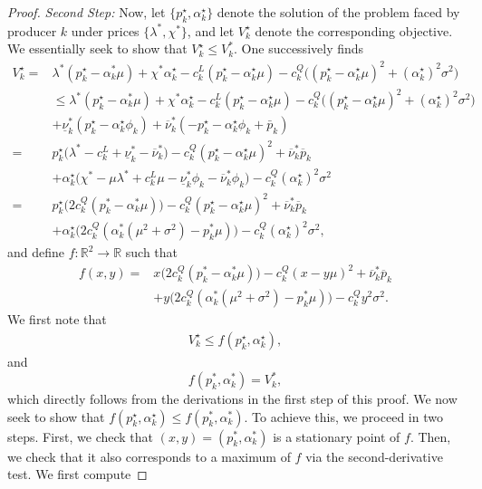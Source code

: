 \documentclass{article}
\begin{document}
\begin{proof}
\textit{Second Step:} Now, let $\{p_k^\star, \alpha_k^\star\}$ denote the solution of the problem faced by producer $k$ under prices $\{\lambda^*, \chi^*\}$, and let $V_k^\star$ denote the corresponding objective. We essentially seek to show that $V_k^\star \le V_k^*$. One successively finds
\begin{align*}
    V_k^\star =& \lambda^*(p_k^\star - \alpha_k^* \mu) + \chi^* \alpha_k^\star - c_k^L(p_k^\star - \alpha_k^\star \mu) - c_k^Q\big((p_k^\star - \alpha_k^\star \mu)^2 + (\alpha_k^\star)^2\sigma^2\big)\\
    &\le \lambda^*(p_k^\star - \alpha_k^* \mu) + \chi^* \alpha_k^\star - c_k^L(p_k^\star - \alpha_k^\star \mu) - c_k^Q\big((p_k^\star - \alpha_k^\star \mu)^2 + (\alpha_k^\star)^2\sigma^2\big)\\
    &+ \underline{\nu}_k^* (p_k^\star - \alpha_k^\star \phi_k) + \overline{\nu}_k^*(-p_k^\star - \alpha_k^\star \phi_k + \bar{p}_k)\\
    =& p_k^\star\big(\lambda^* - c_k^L + \underline{\nu}_k^* - \overline{\nu}_k^*\big) - c_k^Q(p_k^\star - \alpha_k^\star \mu)^2 + \overline{\nu}_k^* \overline{p}_k\\
    &+ \alpha_k^\star\big(\chi^* - \mu \lambda^* + c_k^L \mu - \underline{\nu}_k^* \phi_k - \overline{\nu}_k^* \phi_k\big) - c_k^Q (\alpha_k^\star)^2 \sigma^2 \\
   =& p_k^\star\big(2c_k^Q(p_k^* - \alpha_k^* \mu)\big) - c_k^Q(p_k^\star - \alpha_k^\star \mu)^2 + \overline{\nu}_k^* \overline{p}_k\\ 
    &+ \alpha_k^\star\big(2c_k^Q(\alpha_k^*(\mu^2+\sigma^2) - p_k^* \mu)\big) - c_k^Q (\alpha_k^\star)^2 \sigma^2,
\end{align*}
and define $f:\mathbb{R}^2 \rightarrow \mathbb{R}$ such that
\begin{align*}
f(x, y) =& x \big(2c_k^Q(p_k^* - \alpha_k^* \mu)\big) - c_k^Q(x - y \mu)^2 + \overline{\nu}_k^* \overline{p}_k\\ 
    &+ y \big(2c_k^Q(\alpha_k^*(\mu^2+\sigma^2) - p_k^* \mu)\big) - c_k^Q y^2 \sigma^2.
\end{align*}
We first note that
\begin{align*}
V_k^\star \le f(p_k^\star, \alpha_k^\star),
\end{align*} 
and
\begin{equation*}
f(p_k^*, \alpha_k^*) = V_k^*,
\end{equation*}
which directly follows from the derivations in the first step of this proof. We now seek to show that $f(p_k^\star, \alpha_k^\star) \le f(p_k^*, \alpha_k^*)$. To achieve this, we proceed in two steps. First, we check that $(x, y) = (p_k^*, \alpha_k^*)$ is a stationary point of $f$. Then, we check that it also corresponds to a maximum of $f$ via the second-derivative test. We first compute

\end{proof}
\end{document}
